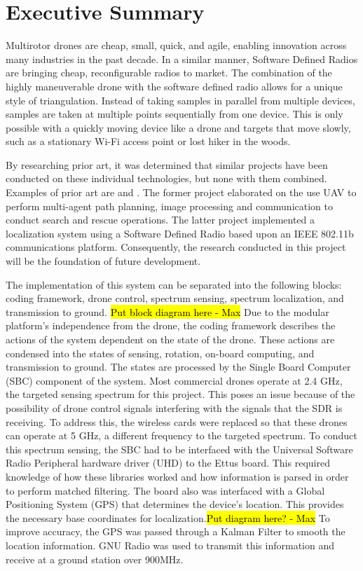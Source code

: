 \chapter*{Executive Summary}
Multirotor drones are cheap, small, quick, and agile, enabling innovation across many industries in the past decade. In a similar manner, Software Defined Radios are bringing cheap, reconfigurable radios to market. The combination of the highly maneuverable drone with the software defined radio allows for a unique style of triangulation. Instead of taking samples in parallel from multiple devices, samples are taken at multiple points sequentially from one device. This is only possible with a quickly moving device like a drone and targets that move slowly, such as a stationary Wi-Fi access point or lost hiker in the woods. \par

By researching prior art, it was determined that similar projects have been conducted on these individual technologies, but none with them combined. Examples of prior art are \cite{path_planning_snr_mqp} and \cite{sdr_localization_mqp}. The former project elaborated on the use UAV to perform multi-agent path planning, image processing and communication to conduct search and rescue operations. The latter project implemented a localization system using a Software Defined Radio based upon an IEEE 802.11b communications platform. Consequently, the research conducted in this project will be the foundation of future development. \par

The implementation of this system can be separated into the following blocks: coding framework, drone control, spectrum sensing, spectrum localization, and transmission to ground. \hl{Put block diagram here - Max} Due to the modular platform's independence from the drone, the coding framework describes the actions of the system dependent on the state of the drone. These actions are condensed into the states of sensing, rotation, on-board computing, and transmission to ground. The states are processed by the Single Board Computer (SBC) component of the system. Most commercial drones operate at 2.4 GHz, the targeted sensing spectrum for this project. This poses an issue because of the possibility of drone control signals interfering with the signals that the SDR is receiving. To address this, the wireless cards were replaced so that these drones can operate at 5 GHz, a different frequency to the targeted spectrum. To conduct this spectrum sensing, the SBC had to be interfaced with the Universal Software Radio Peripheral hardware driver (UHD) to the Ettus board. This required knowledge of how these libraries worked and how information is parsed in order to perform matched filtering. The board also was interfaced with a Global Positioning System (GPS) that determines the device's location. This provides the necessary base coordinates for localization.\hl{Put diagram here? - Max} To improve accuracy, the GPS was passed through a Kalman Filter to smooth the location information. GNU Radio was used to transmit this information and receive at a ground station over 900MHz. \par 

